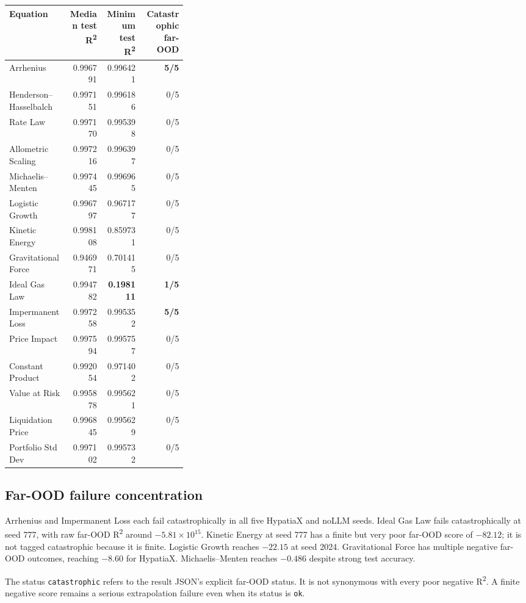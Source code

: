 \documentclass[11pt,a4paper]{article}
\begin{document}
{\small
\begin{longtable}{@{}p{0.34\linewidth}rrr@{}}
\toprule
Equation & Median test R\textsuperscript{2} & Minimum test R\textsuperscript{2} & Catastrophic far-OOD\\
\midrule
Arrhenius & 0.996791 & 0.996421 & \textbf{5/5}\\
Henderson--Hasselbalch & 0.997151 & 0.996186 & 0/5\\
Rate Law & 0.997170 & 0.995398 & 0/5\\
Allometric Scaling & 0.997216 & 0.996397 & 0/5\\
Michaelis--Menten & 0.997445 & 0.996965 & 0/5\\
Logistic Growth & 0.996797 & 0.967177 & 0/5\\
Kinetic Energy & 0.998108 & 0.859731 & 0/5\\
Gravitational Force & 0.946971 & 0.701415 & 0/5\\
Ideal Gas Law & 0.994782 & \textbf{0.198111} & \textbf{1/5}\\
Impermanent Loss & 0.997258 & 0.995352 & \textbf{5/5}\\
Price Impact & 0.997594 & 0.995757 & 0/5\\
Constant Product & 0.992054 & 0.971402 & 0/5\\
Value at Risk & 0.995878 & 0.995621 & 0/5\\
Liquidation Price & 0.996845 & 0.995629 & 0/5\\
Portfolio Std Dev & 0.997102 & 0.995732 & 0/5\\
\bottomrule
\end{longtable}
}

\subsection{Far-OOD failure concentration}
Arrhenius and Impermanent Loss each fail catastrophically in all five HypatiaX and noLLM seeds. Ideal Gas Law fails catastrophically at seed 777, with raw far-OOD R\textsuperscript{2} around $-5.81\times10^{15}$. Kinetic Energy at seed 777 has a finite but very poor far-OOD score of $-82.12$; it is not tagged catastrophic because it is finite. Logistic Growth reaches $-22.15$ at seed 2024. Gravitational Force has multiple negative far-OOD outcomes, reaching $-8.60$ for HypatiaX. Michaelis--Menten reaches $-0.486$ despite strong test accuracy.

The status \texttt{catastrophic} refers to the result JSON's explicit far-OOD status. It is not synonymous with every poor negative R\textsuperscript{2}. A finite negative score remains a serious extrapolation failure even when its status is \texttt{ok}.
\end{document}
